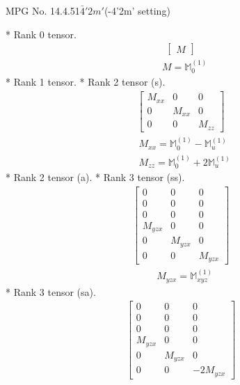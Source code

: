 \documentclass[fleqn,8pt,landscape]{jsarticle}
\begin{document}
\setcounter{MaxMatrixCols}{32}

\renewcommand{\tablename}{Table~}
\renewcommand{\figurename}{Figure~}
\begin{center}
\LARGE
MPG No. 14.4.51\quad$\bar{4}'2m'$\quad(-4'2m' setting)
\end{center}
* Rank 0 tensor.
\begin{align*}
\begin{bmatrix} M \end{bmatrix}
\end{align*}
\begin{align*}
& M = \mathbb{M}_{0}^{(1)}
\end{align*}
* Rank 1 tensor.
* Rank 2 tensor (s).
\begin{align*}
\begin{bmatrix} M_{xx} & 0 & 0 \\ 0 & M_{xx} & 0 \\ 0 & 0 & M_{zz} \end{bmatrix}
\end{align*}
\begin{align*}
& M_{xx} = \mathbb{M}_{0}^{(1)} - \mathbb{M}_{u}^{(1)} \\
& M_{zz} = \mathbb{M}_{0}^{(1)} + 2 \mathbb{M}_{u}^{(1)}
\end{align*}
* Rank 2 tensor (a).
* Rank 3 tensor (ss).
\begin{align*}
\begin{bmatrix} 0 & 0 & 0 \\ 0 & 0 & 0 \\ 0 & 0 & 0 \\ M_{yzx} & 0 & 0 \\ 0 & M_{yzx} & 0 \\ 0 & 0 & M_{yzx} \end{bmatrix}
\end{align*}
\begin{align*}
& M_{yzx} = \mathbb{M}_{xyz}^{(1)}
\end{align*}
* Rank 3 tensor (sa).
\begin{align*}
\begin{bmatrix} 0 & 0 & 0 \\ 0 & 0 & 0 \\ 0 & 0 & 0 \\ M_{yzx} & 0 & 0 \\ 0 & M_{yzx} & 0 \\ 0 & 0 & - 2 M_{yzx} \end{bmatrix}
\end{align*}
\end{document}
